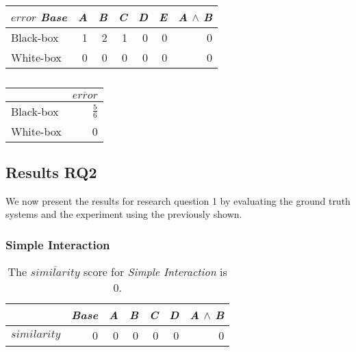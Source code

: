         \begin{table}[H]
            \begin{minipage}{.5\linewidth}
                \centering
                \begin{tabular}{lrrrrrr}    \toprule
                $error$    \emph{Base} & \emph{A} & \emph{B} & \emph{C} & \emph{D} & \emph{E} & \emph{A} $\land$ \emph{B}   \\ \midrule
                Black-box & 1 & 2 & 1 & 0 & 0 & 0       \\
                White-box & 0 & 0 & 0 & 0 & 0 & 0      \\ \bottomrule
                \end{tabular}
                \caption{}
            \end{minipage}%
            \hspace{7mm}
            \begin{minipage}{.3\linewidth}
                \centering
                \begin{tabular}{lr}
                    \toprule
                              & $\overline{error}$   \\ \midrule
                    Black-box & $\frac{5}{6}$              \\
                    White-box & 0              \\ \bottomrule
                    \end{tabular}
                    \caption{}  
                \end{minipage}
            \end{table}


\subsection{Results RQ2}

We now present the results for research question 1 by evaluating the ground truth systems and the experiment using the {\perfInfluenceModel} 
previously shown.

\subsubsection*{Simple Interaction}

\begin{table}[H]
    \centering
    \begin{tabular}{lrrrrrr}    \toprule
               & \emph{Base} & \emph{A} & \emph{B} & \emph{C} & \emph{D} & \emph{A} $\land$ \emph{B}   \\ \midrule
    $similarity$ & 0 & 0 & 0 & 0 & 0 & 0      \\ \bottomrule
    \end{tabular}
    \caption{The $\overline{similarity}$ score for \emph{Simple Interaction} is $0$.}
\end{table}

